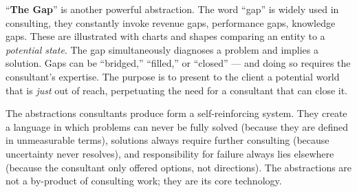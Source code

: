 \documentclass[11pt,a4paper]{article}
\begin{document}
``\textbf{The Gap}'' is another powerful abstraction. The word ``gap'' is widely used in consulting, they constantly invoke revenue gaps, performance gaps, knowledge gaps. These are illustrated with charts and shapes comparing an entity to a \textit{potential state}. The gap simultaneously diagnoses a problem and implies a solution. Gaps can be ``bridged,'' ``filled,'' or ``closed'' --- and doing so requires the consultant's expertise. The purpose is to present to the client a potential world that is \textit{just} out of reach, perpetuating the need for a consultant that can close it.

The abstractions consultants produce form a self-reinforcing system. They create a language in which problems can never be fully solved (because they are defined in unmeasurable terms), solutions always require further consulting (because uncertainty never resolves), and responsibility for failure always lies elsewhere (because the consultant only offered options, not directions). The abstractions are not a by-product of consulting work; they are its core technology.
\end{document}
